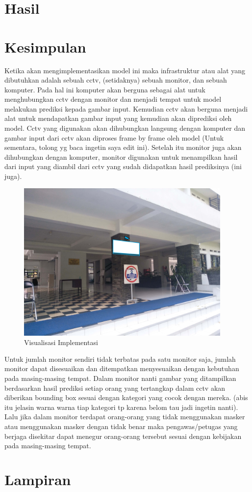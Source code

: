 \documentclass{article}
\begin{document}
  \section{Hasil}
  \section{Kesimpulan}
  	Ketika akan mengimplementasikan model ini maka infrastruktur atau alat yang dibutuhkan adalah sebuah cctv, (setidaknya) sebuah monitor, dan sebuah komputer. Pada hal ini komputer akan berguna sebagai alat untuk menghubungkan cctv dengan monitor dan menjadi tempat untuk model melakukan prediksi kepada gambar input. Kemudian cctv akan berguna menjadi alat untuk mendapatkan gambar input yang kemudian akan diprediksi oleh model. Cctv yang digunakan akan dihubungkan langsung dengan komputer dan gambar input dari cctv akan diproses frame by frame oleh model (Untuk sementara, tolong yg baca ingetin saya edit ini). Setelah itu monitor juga akan dihubungkan dengan komputer, monitor digunakan untuk menampilkan hasil dari input yang diambil dari cctv yang sudah didapatkan hasil prediksinya (ini juga). 
  	\begin{figure}[H]
  		\centering
  		\includegraphics[width=400px]{implementasi/test.jpg}
  		\caption{Visualisasi Implementasi}
  	\end{figure}
	\par Untuk jumlah monitor sendiri tidak terbatas pada satu monitor saja, jumlah monitor dapat disesuaikan dan ditempatkan menyesuaikan dengan kebutuhan pada masing-masing tempat. Dalam monitor nanti gambar yang ditampilkan berdasarkan hasil prediksi setiap orang yang tertangkap dalam cctv akan diberikan bounding box sesuai dengan kategori yang cocok dengan mereka. (abis itu jelasin warna warna tiap kategori tp karena belom tau jadi ingetin nanti). Lalu jika dalam monitor terdapat orang-orang yang tidak menggunakan masker atau menggunakan masker dengan tidak benar maka pengawas/petugas yang berjaga disekitar dapat menegur orang-orang tersebut sesuai dengan kebijakan pada masing-masing tempat.
  \section{Lampiran}
  \newpage
  \printbibliography[title={Referensi}]
\end{document}
